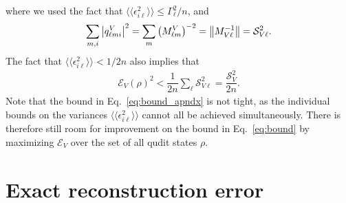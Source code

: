 \documentclass[notitlepage,twocolumn]{revtex4-2}
\newcommand{\f}[2]{\dfrac{#1}{#2}} %
\newcommand{\p}[1]{\left(#1\right)} %
\newcommand{\bbk}[1]{\langle\!\langle #1 \rangle\!\rangle}
\newcommand{\E}{\mathcal{E}}
\renewcommand{\S}{\mathcal{S}}
\begin{document}
where we used the fact that $\bbk{\epsilon_{i\ell}^2}\le\Gamma_\ell^2/n$, and
\begin{align}
  \sum_{m,i} \abs{q^V_{\ell mi}}^2
  = \sum_m \p{M^V_{\ell m}}^{-2}
  = \norm{M_{V\ell}^{-1}}
  = \S_{V\ell}^2.
\end{align}
The fact that $\bbk{\epsilon_{i\ell}^2}<1/2n$ also implies that
\begin{align}
  \E_V\p{\rho}^2 < \f1{2n} \sum_\ell \S_{V\ell}^2 = \f{\S_V^2}{2n}.
\end{align}
Note that the bound in Eq.~\eqref{eq:bound_apndx} is not tight, as the individual bounds on the variances $\bbk{\epsilon_{i\ell}^2}$ cannot all be achieved simultaneously.
There is therefore still room for improvement on the bound in Eq.~\eqref{eq:bound} by maximizing $\E_V$ over the set of all qudit states $\rho$.

\section{Exact reconstruction error}
\label{sec:exact_error}
\end{document}
